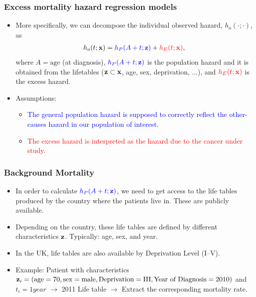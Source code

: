 \documentclass[10pt,handout,compress]{beamer}
\newcommand{\bx}{{\bf x}}
\newcommand{\bz}{{\bf z}}
\begin{document}
\begin{frame}
\frametitle{Excess mortality hazard regression models}
\begin{itemize}
\item More specifically, we can decompose the individual observed hazard, $h_o(\cdot;\cdot)$, as \pause
\begin{eqnarray}\label{HazardAddModel}
h_o(t;\bx) = \textcolor{blue}{h_P(A+t;\bz)} + \textcolor{red}{h_E(t;\bx)},
\end{eqnarray}
where $A=\text{age}$ (at diagnosis),  $\textcolor{blue}{h_P(A+t;\bz)}$ is the population hazard and it is obtained from the lifetables ($\bz \subset \bx$, age, sex, deprivation, $\ldots$), and $\textcolor{red}{h_E(t;\bx)}$ is the excess hazard. \pause

\item Assumptions:
\begin{itemize}
\item \textcolor{blue}{The general population hazard is supposed to correctly reflect the other-causes hazard in our population of interest.}%
\item \textcolor{red}{The excess hazard is interpreted as the hazard due to the cancer under study.}
\end{itemize}
\end{itemize}
\end{frame}


\begin{frame}
\frametitle{Background Mortality}
\begin{itemize}
\item In order to calculate $\textcolor{blue}{h_P(A+t;\bz)} $, we need to get access to the life tables produced by the country where the patients live in. These are publicly available.
\pause
\item Depending on the country, these life tables are defined by different characteristics $\bz$. Typically: age, sex, and year.
\pause
\item In the UK, life tables are also available by Deprivation Level (I--V).
\pause
\item Example: Patient with characteristics $\bz_i = (\text{age} = 70, \text{sex} = \text{male}, \text{Deprivation} = \text{III}, \text{Year of Diagnosis} = 2010)$ and $t_i = 1 year$ \pause $\longrightarrow$ 2011 Life table  \pause $\longrightarrow$ Extract the corresponding mortality rate.
\end{itemize}
\end{frame}
\end{document}
